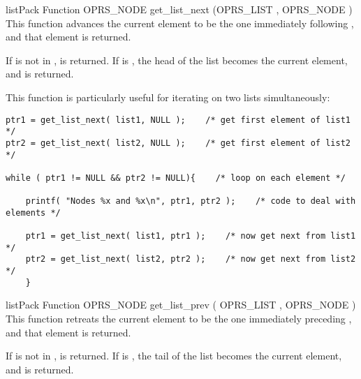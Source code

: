 \begin{typefn}{listPack Function} {OPRS\_NODE} {get\_list\_next} {(OPRS\_LIST ,
OPRS\_NODE )}
This function advances the current  element to be the one
immediately following , and that element is
returned.

If  is not in ,  is
returned.
If  is , the head of the list becomes the
current element, and is returned.

This function is particularly useful for iterating on two lists
simultaneously:
\begin{verbatim}
ptr1 = get_list_next( list1, NULL );    /* get first element of list1 */
ptr2 = get_list_next( list2, NULL );    /* get first element of list2 */

while ( ptr1 != NULL && ptr2 != NULL){    /* loop on each element */

    printf( "Nodes %x and %x\n", ptr1, ptr2 );    /* code to deal with elements */

    ptr1 = get_list_next( list1, ptr1 );    /* now get next from list1 */
    ptr2 = get_list_next( list2, ptr2 );    /* now get next from list2 */
    }
\end{verbatim}
\end{typefn}

\begin{typefn}{listPack Function} {OPRS\_NODE} {get\_list\_prev} {( OPRS\_LIST ,
OPRS\_NODE
)}
This function retreats the current  element to be the one
immediately preceding , and that element is
returned.

If  is not in ,  is returned.
If  is , the tail of the list becomes the current
element, and is returned.
\end{typefn}

